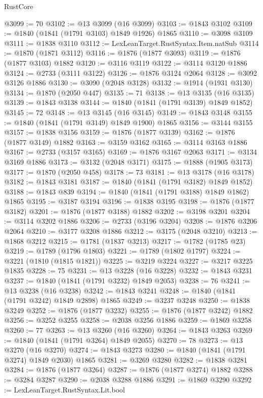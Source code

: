 \begin{lexlean}{RustCore}
\begin{coremodule}
@3099 := 70
@3102 := @13 @3099 (@16 @3099)
@3103 := @1843 @3102
@3109 := @1840 (@1841 (@1791 @3103) @1849 @1926) @1865
@3110 := @3098 @3109
@3111 := @1838 @3110
@3112 := LexLeanTarget.RustSyntax.Item.natSub
@3114 := @1870 (@1871 @3112)
@3116 := @1876 (@1877 @3093)
@3119 := @1876 (@1877 @3103) @1882
@3120 := @3116 @3119
@3122 := @3114 @3120 @1886
@3124 := @2733 (@3111 @3122)
@3126 := @1876 @3124 @2064
@3128 := @3092 @3126 @1886
@3130 := @3090 (@2048 @3128)
@3132 := @1914 (@1931 @3130)
@3134 := @1870 (@2050 @447)
@3135 := 71
@3138 := @13 @3135 (@16 @3135)
@3139 := @1843 @3138
@3144 := @1840 (@1841 (@1791 @3139) @1849 @1852)
@3145 := 72
@3148 := @13 @3145 (@16 @3145)
@3149 := @1843 @3148
@3155 := @1840 (@1841 (@1791 @3149) @1849 @1900) @1865
@3156 := @3144 @3155
@3157 := @1838 @3156
@3159 := @1876 (@1877 @3139)
@3162 := @1876 (@1877 @3149) @1882
@3163 := @3159 @3162
@3165 := @3114 @3163 @1886
@3167 := @2733 (@3157 @3165)
@3169 := @1876 @3167 @2063
@3171 := @3134 @3169 @1886
@3173 := @3132 (@2048 @3171)
@3175 := @1888 (@1905 @3173)
@3177 := @1870 (@2050 @458)
@3178 := 73
@3181 := @13 @3178 (@16 @3178)
@3182 := @1843 @3181
@3187 := @1840 (@1841 (@1791 @3182) @1849 @1852)
@3188 := @1843 @839
@3194 := @1840 (@1841 (@1791 @3188) @1849 @1862) @1865
@3195 := @3187 @3194
@3196 := @1838 @3195
@3198 := @1876 (@1877 @3182)
@3201 := @1876 (@1877 @3188) @1882
@3202 := @3198 @3201
@3204 := @3114 @3202 @1886
@3206 := @2733 (@3196 @3204)
@3208 := @1876 @3206 @2064
@3210 := @3177 @3208 @1886
@3212 := @3175 (@2048 @3210)
@3213 := @1868 @3212
@3215 := @1781 (@1837 @3213)
@3217 := @1782 (@1785 @23)
@3219 := @1789 (@1796 @1803)
@3221 := @1789 (@1802 @1797)
@3224 := @3221 (@1810 (@1815 @1821))
@3225 := @3219 @3224
@3227 := @3217 @3225 @1835
@3228 := 75
@3231 := @13 @3228 (@16 @3228)
@3232 := @1843 @3231
@3237 := @1840 (@1841 (@1791 @3232) @1849 @2053)
@3238 := 76
@3241 := @13 @3238 (@16 @3238)
@3242 := @1843 @3241
@3248 := @1840 (@1841 (@1791 @3242) @1849 @2898) @1865
@3249 := @3237 @3248
@3250 := @1838 @3249
@3252 := @1876 (@1877 @3232)
@3255 := @1876 (@1877 @3242) @1882
@3256 := @3252 @3255
@3258 := @2038 @3256 @1886
@3259 := @1869 @3258
@3260 := 77
@3263 := @13 @3260 (@16 @3260)
@3264 := @1843 @3263
@3269 := @1840 (@1841 (@1791 @3264) @1849 @2055)
@3270 := 78
@3273 := @13 @3270 (@16 @3270)
@3274 := @1843 @3273
@3280 := @1840 (@1841 (@1791 @3274) @1849 @2030) @1865
@3281 := @3269 @3280
@3282 := @1838 @3281
@3284 := @1876 (@1877 @3264)
@3287 := @1876 (@1877 @3274) @1882
@3288 := @3284 @3287
@3290 := @2038 @3288 @1886
@3291 := @1869 @3290
@3292 := LexLeanTarget.RustSyntax.Lit.bool

\end{coremodule}
\end{lexlean}
